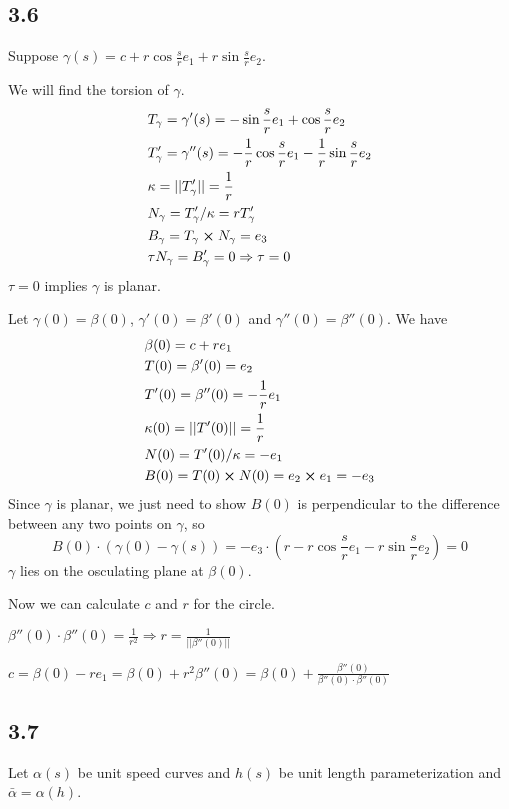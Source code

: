 \documentclass[12pt]{article}
\begin{document}
\subsection*{3.6}
Suppose $\gamma(s) = c + r\cos \frac{s}{r} e_1 + r \sin \frac{s}{r} e_2$.

We will find the torsion of $\gamma$. $$
\begin{aligned}
	&T_{\gamma} = \gamma'(s) = -\sin \frac{s}{r} e_1 + \cos \frac{s}{r}e_2 \\
	&T'_{\gamma} = \gamma''(s) = -\frac{1}{r} \cos \frac{s}{r}e_1 - \frac{1}{r} \sin \frac{s}{r} e_2 \\
	&\kappa = ||T'_{\gamma}|| = \frac{1}{r} \\
	&N_{\gamma} = T'_{\gamma} / \kappa =r T'_{\gamma} \\
	&B_{\gamma} = T_{\gamma} \cross N_{\gamma} = e_3 \\
	&\tau N_{\gamma} = B'_{\gamma} = 0 \Rightarrow \tau = 0
\end{aligned}$$
$\tau = 0$ implies $\gamma$ is planar. 

Let $\gamma(0) = \beta(0)$, $\gamma'(0) = \beta'(0)$ and $\gamma''(0) = \beta''(0)$. We have $$
\begin{aligned}
	&\beta(0) = c + re_1 \\
	&T(0) = \beta'(0) = e_2  \\
	&T'(0) = \beta''(0) = - \frac{1}{r} e_1 \\
	& \kappa(0) = ||T'(0)|| = \frac{1}{r} \\
	& N(0) = T'(0) / \kappa = - e_1 \\
	& B(0) = T(0) \cross N(0) = e_2 \cross e_1 = -e_3
\end{aligned}
$$
Since $\gamma$ is planar, we just need to show $B(0)$ is perpendicular to the difference between any two points on $\gamma$, so $$
B(0)\cdot (\gamma(0) - \gamma(s)) = - e_3 \cdot (r- r\cos \frac{s}{r}e_1 - r\sin \frac{s}{r}e_2) = 0$$
$\gamma$ lies on the osculating plane at $\beta(0)$.

Now we can calculate $c$ and $r$ for the circle.

$\beta''(0) \cdot \beta''(0) = \frac{1}{r^2} \Rightarrow r = \frac{1}{||\beta''(0)||}$

$c = \beta(0) - r e_1 = \beta(0) + r^2 \beta''(0) =\beta(0) + \frac{\beta''(0)}{\beta''(0) \cdot \beta''(0)} $

\subsection*{3.7}
Let $\alpha(s)$ be unit speed curves and $h(s)$ be unit length parameterization and $\bar{\alpha} = \alpha(h)$.
\end{document}
